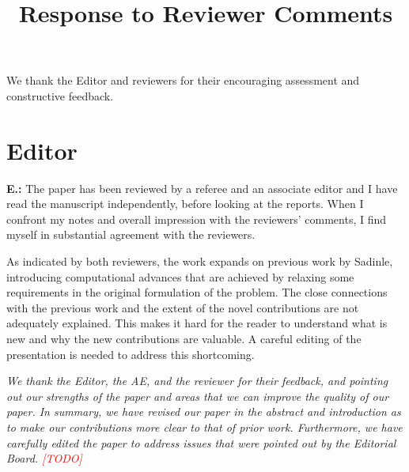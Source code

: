 \documentclass[letterpaper, parskip]{scrartcl}
\newcommand{\pointRaised}[2]{%
	\textbf{#1.\theresponsectr:} #2
}
\newcounter{responsectr}[section]     %
\newcommand{\reply}[1]{%
	\refstepcounter{responsectr}%
		\begin{tcolorbox}
			\itshape #1
		\end{tcolorbox}
}
\newcommand{\todo}{\textcolor{red}{[TODO]}\xspace}
\begin{document}
	
	
	\title{Response to Reviewer Comments}
	
	\maketitle
	We thank the Editor and reviewers for their encouraging assessment and constructive 
	feedback.
	
	
	\section*{Editor}
	
	
	\pointRaised{E}{%
	The paper has been reviewed by a referee and an associate editor and I have read the manuscript independently, before looking at the reports.  When I confront my notes and overall impression with the reviewers’ comments, I find myself in substantial agreement with the reviewers.
	
	As indicated by both reviewers, the work expands on previous work by Sadinle, introducing computational advances that are achieved by relaxing some requirements in the original formulation of the problem.  The close connections with the previous work and the extent of the novel contributions are not adequately explained.  This makes it hard for the reader to understand what is new and why the new contributions are valuable.  A careful editing of the presentation is needed to address this shortcoming.}
	
			\reply{%
	We thank the Editor, the AE, and the reviewer for their feedback, and pointing out our strengths of the paper and areas that we can improve the quality of our paper. In summary, we have revised our paper in the abstract and introduction as to make our contributions more clear to that of prior work.  Furthermore, we have carefully edited the paper to address issues that were pointed out by the Editorial Board. \todo
	}
	
	\newpage
\end{document}

